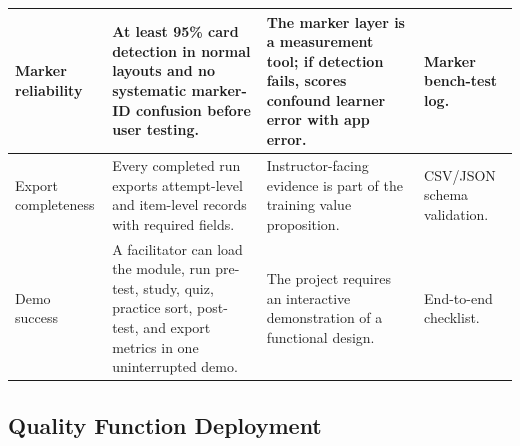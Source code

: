 \documentclass[10pt,a4paper]{article}
\begin{document}
\begin{table}[H]
\begin{tabularx}{\textwidth}{|>{\raggedright\arraybackslash}X|>{\raggedright\arraybackslash}X|>{\raggedright\arraybackslash}X|>{\raggedright\arraybackslash}X|}
\hline
Marker reliability & At least 95\% card detection in normal layouts and no systematic marker-ID confusion before user testing. & The marker layer is a measurement tool; if detection fails, scores confound learner error with app error. & Marker bench-test log. \\
\hline
Export completeness & Every completed run exports attempt-level and item-level records with required fields. & Instructor-facing evidence is part of the training value proposition. & CSV/JSON schema validation. \\
\hline
Demo success & A facilitator can load the module, run pre-test, study, quiz, practice sort, post-test, and export metrics in one uninterrupted demo. & The project requires an interactive demonstration of a functional design. & End-to-end checklist. \\
\hline
\end{tabularx}
\end{table}
\subsection{Quality Function Deployment}
\label{sec:quality-function-deployment}
\end{document}
